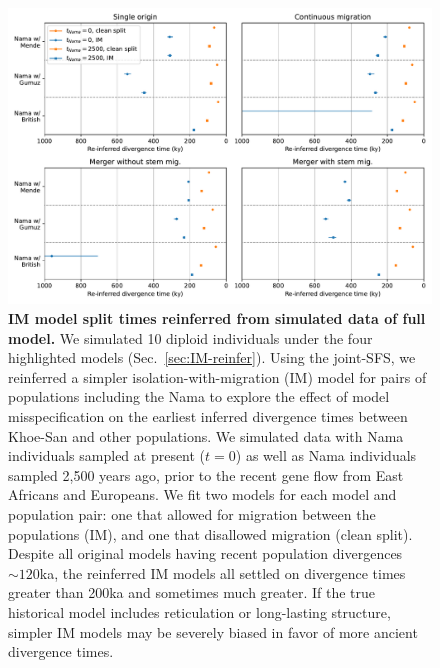 \documentclass[]{article}
\begin{document}
\begin{figure}[ht]
    \centering
    \includegraphics[width=\textwidth]{figures/supp-IM-misspecification}
    \caption{
        \textbf{IM model split times reinferred from simulated data of full
        model.} We simulated 10 diploid individuals under the four highlighted
        models (Sec.~\ref{sec:IM-reinfer}). Using the joint-SFS, we reinferred
        a simpler isolation-with-migration (IM) model for pairs of populations
        including the Nama to explore the effect of model misspecification on
        the earliest inferred divergence times between Khoe-San and other
        populations. We simulated data with Nama individuals sampled at present
        ($t=0$) as well as Nama individuals sampled 2,500 years ago, prior to
        the recent gene flow from East Africans and Europeans. We fit two
        models for each model and population pair: one that allowed for
        migration between the populations (IM), and one that disallowed
        migration (clean split). Despite all original models having recent
        population divergences $\sim120$ka, the reinferred IM models all
        settled on divergence times greater than 200ka and sometimes much
        greater. If the true historical model includes reticulation or
        long-lasting structure, simpler IM models may be severely biased in
        favor of more ancient divergence times.
    }
    \label{fig:supp-IM-misspecification}
\end{figure}
\end{document}
